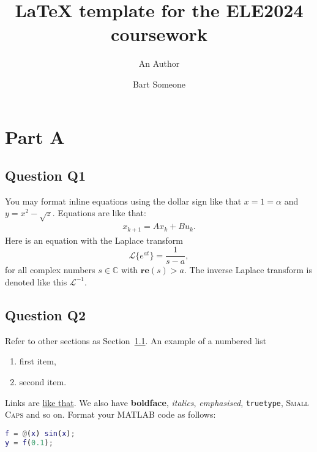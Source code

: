 \documentclass[a4paper,10pt,reqno]{amsart}
\title[ELE2024 Coursework]{LaTeX template for the ELE2024 coursework}
\author[A. Author]{An Author}
\author[B. Someone]{Bart Someone}
\numberwithin{equation}{section}
\renewcommand{\Re}{\mathbf{re}}
\newcommand{\C}{\mathbb{C}}
\newcommand{\lap}{\mathscr{L}}
\begin{document}
\maketitle


\section{Part A}

\subsection{Question Q1}\label{sec:q1}
You may format inline equations using the dollar sign
like that $x = 1 = \alpha$ and $y = x^2 - \sqrt{z}$.
Equations are like that:
\begin{align}
 \label{eq:lti_state_update}
 x_{k+1} = A x_k + Bu_k.
\end{align}
Here is an equation with the Laplace transform
\begin{equation}
    \lap \{e^{at}\} = \frac{1}{s-a},
\end{equation}
for all complex numbers $s\in\C$ with $\Re(s)>a$.
The inverse Laplace transform is denoted like this $\lap^{-1}$.




\subsection{Question Q2}
Refer to other sections as Section~\ref{sec:q1}. An example of a numbered list
\begin{enumerate}
 \item first item,
 \item second item.
\end{enumerate}
Links are \href{https://google.com}{like that}. We also have \textbf{boldface}, \textit{italics},
\emph{emphasised}, \texttt{truetype}, \textsc{Small Caps} and so on.
Format your MATLAB code as follows:
\begin{lstlisting}[language=matlab]
% My code:
f = @(x) sin(x);
y = f(0.1);
\end{lstlisting}
\end{document}
